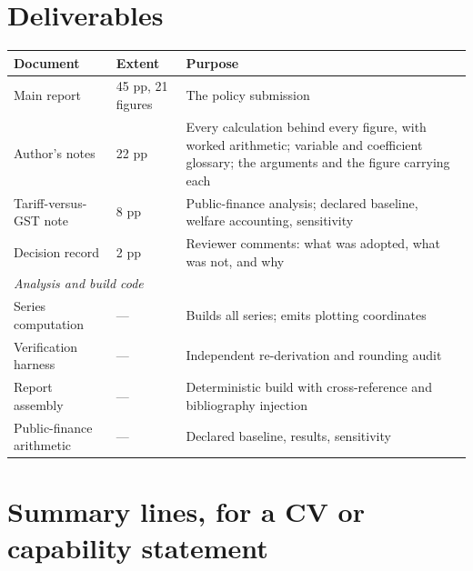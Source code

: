 \documentclass[11pt, a4paper]{article}
\begin{document}
\section{Deliverables}

\begin{table}[H]
\centering\small
\begin{tabular}{p{5.6cm}p{1.6cm}p{7.8cm}}
\toprule
\textbf{Document} & \textbf{Extent} & \textbf{Purpose} \\
\midrule
Main report & 45 pp, 21 figures & The policy submission \\
Author's notes & 22 pp & Every calculation behind every figure, with worked arithmetic; variable and coefficient glossary; the arguments and the figure carrying each \\
Tariff-versus-GST note & 8 pp & Public-finance analysis; declared baseline, welfare accounting, sensitivity \\
Decision record & 2 pp & Reviewer comments: what was adopted, what was not, and why \\
\midrule
\multicolumn{3}{l}{\textit{Analysis and build code}} \\
Series computation & --- & Builds all series; emits plotting coordinates \\
Verification harness & --- & Independent re-derivation and rounding audit \\
Report assembly & --- & Deterministic build with cross-reference and bibliography injection \\
Public-finance arithmetic & --- & Declared baseline, results, sensitivity \\
\bottomrule
\end{tabular}
\end{table}

\section{Summary lines, for a CV or capability statement}
\end{document}

